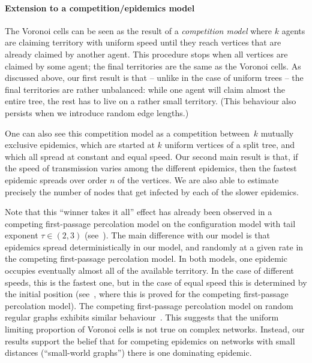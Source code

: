\documentclass[10pt]{amsart}
\theoremstyle{definition}\newtheorem{defi}[theo]{Definition}\newtheorem{rema}[theo]{Remark}\newtheorem{exam}[theo]{Example}\newtheorem{exem}[theo]{Example}\newtheorem{nota}[theo]{Notation}
\begin{document}
\paragraph*{Extension to a competition/epidemics model}
The Voronoi cells can be seen as the result of a \emph{competition model} where $k$ agents are claiming territory with uniform speed until they reach vertices that are already claimed by another agent. This procedure stops when all vertices are claimed by some agent; the final territories are the same as the Voronoi cells. As discussed above, our first result is that -- unlike in the case of uniform trees -- the final territories are rather unbalanced: while one agent will claim almost the entire tree, the rest has to live on a rather small territory. (This behaviour also persists when we introduce random edge lengths.)

One can also see this competition model as a competition between~$k$ mutually exclusive epidemics, which are started at $k$ uniform vertices of a split tree, and which all spread at constant and equal speed. Our second main result is that, if the speed of transmission varies among the different epidemics, then the fastest epidemic spreads over order $n$ of the vertices. We are also able to estimate precisely the number of nodes that get infected by each of the slower epidemics.

Note that this ``winner takes it all'' effect has already been observed in a competing first-passage percolation model on the configuration model with tail exponent $\tau\in(2,3)$ (see~\cite{deijfen2016}). The main difference with our model is that epidemics spread deterministically in our model, and randomly at a given rate in the competing first-passage percolation model. In both models, one epidemic occupies eventually almost all of the available territory. In the case of different speeds, this is the fastest one, but in the case of equal speed this is determined by the initial position (see~\cite{BaronHofstKomja15,HofstKomja15}, where this is proved for the competing first-passage percolation model). The competing first-passage percolation model on random regular graphs exhibits similar behaviour~\cite{Antun17}. This suggests that the uniform limiting proportion of Voronoi cells is not true on complex networks. Instead, our results support the belief that for competing epidemics on networks with small distances (``small-world graphs'') there is one dominating epidemic.
\end{document}
